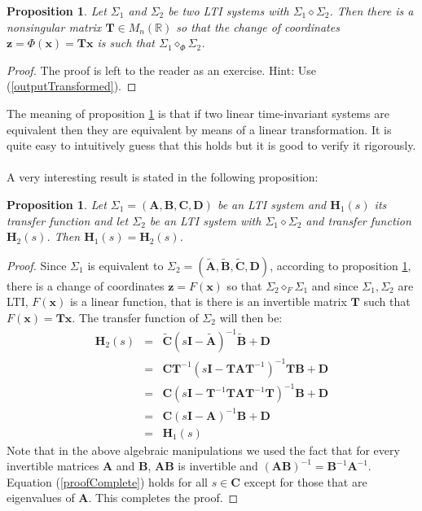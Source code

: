 \documentclass[a4paper,10pt,oneside]{book}
\newtheorem{proposition}[theorem]{Proposition}
\begin{document}
\begin{proposition}\label{prop:lti_transformation}
 Let $\Sigma_1$ and $\Sigma_2$ be two LTI systems with $\Sigma_1\diamond\Sigma_2$. Then there is a nonsingular matrix $\mathbf{T}\in M_n(\mathbb{R})$ so that the change of coordinates $\mathbf{z}=\Phi(\mathbf{x})=\mathbf{Tx}$ is such that $\Sigma_1\diamond_{\Phi}\Sigma_2$.
\end{proposition}
\begin{proof}
 The proof is left to the reader as an exercise. Hint: Use (\ref{outputTransformed}).
\end{proof}
The meaning of proposition \ref{prop:lti_transformation} is that if two linear time-invariant systems are equivalent then they are equivalent by means of a linear transformation. It is quite easy to intuitively guess that this holds but it is good to verify it rigorously.\\
\\
A very interesting result is stated in the following proposition:
\begin{proposition}
 Let $\Sigma_1=(\mathbf{A},\mathbf{B},\mathbf{C},\mathbf{D})$ be an LTI system and $\mathbf{H}_1(s)$ its transfer function and let $\Sigma_2$ be an LTI system with $\Sigma_1\diamond\Sigma_2$ and transfer function $\mathbf{H}_2(s)$. Then $\mathbf{H}_1(s)=\mathbf{H}_2(s)$.
\end{proposition}
\begin{proof}
Since $\Sigma_1$ is equivalent to $\Sigma_2=(\tilde{\mathbf{A}},\tilde{\mathbf{B}},\tilde{\mathbf{C}},\mathbf{D})$, according to proposition \ref{prop:lti_transformation}, there is a change of coordinates $\mathbf{z}=F(\mathbf{x})$ so that $\Sigma_2\diamond_{F}\Sigma_1$ and since $\Sigma_1,\Sigma_2$ are LTI, $F(\mathbf{x})$ is a linear function, that is there is an invertible matrix $\mathbf{T}$ such that $F(\mathbf{x})=\mathbf{Tx}$. The transfer function of $\Sigma_2$ will then be:
\begin{eqnarray}
 \mathbf{H}_2(s)&=&\tilde{\mathbf{C}}(s\mathbf{I}-\tilde{\mathbf{A}})^{-1}\tilde{\mathbf{B}}+\mathbf{D}\\
                &=&\mathbf{CT}^{-1}(s\mathbf{I}-\mathbf{TAT}^{-1})^{-1}\mathbf{TB}+\mathbf{D}\\
                &=&\mathbf{C}(s\mathbf{I}-\mathbf{T}^{-1}\mathbf{TAT}^{-1}\mathbf{T})^{-1}\mathbf{B}+\mathbf{D}\\
                &=&\mathbf{C}(s\mathbf{I}-\mathbf{A})^{-1}\mathbf{B}+\mathbf{D}\\
                &=&\mathbf{H}_1(s)\label{proofComplete}
\end{eqnarray}
Note that in the above algebraic manipulations we used the fact that for every invertible matrices $\mathbf{A}$ and $\mathbf{B}$, $\mathbf{AB}$ is invertible and $(\mathbf{AB})^{-1}=\mathbf{B}^{-1}\mathbf{A}^{-1}$. Equation (\ref{proofComplete}) holds for all $s\in\mathbf{C}$ except for those that are eigenvalues of $\mathbf{A}$. This completes the proof.
\end{proof}
\end{document}
